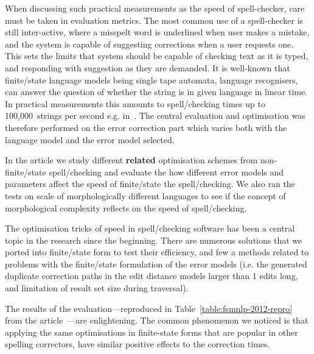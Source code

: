 \documentclass[officiallayout]{unihelcompling}
\begin{document}
When discussing such practical measurements as the speed of spell-checker, care
must be taken in evaluation metrics. The most common use of a spell-checker is
still inter-active, where a misspelt word is underlined when user makes a
mistake, and the system is capable of suggesting corrections when a user
requests one. This sets the limits that system should be capable of checking
text as it is typed, and responding with suggestion as they are demanded. It is
well-known that finite\-/state language models being single tape automata,
language recognisers, can answer the question of whether the string is in given
language in linear time. In practical measurements this amounts to
spell\-/checking times up to 100,000~strings per second e.g.
in~\citet{silfverberg2009hfst}. The central evaluation and optimisation was
therefore performed on the error correction part which varies both with the
language model and the error model selected.

In the article we study different \textbf{related} optimisation schemes from
non-finite\-/state spell\-/checking and evaluate the how different error models and
parameters affect the speed of finite\-/state the spell\-/checking. We also ran the
tests on scale of morphologically different languages to see if the concept of
morphological complexity reflects on the speed of spell\-/checking.

The optimisation tricks of speed in spell\-/checking software has been a central
topic in the research since the beginning. There are numerous solutions that we
ported into finite\-/state form to test their efficiency, and few a methods
related to problems with the finite\-/state formulation of the error models (i.e.
the generated duplicate correction paths in the edit distance models larger
than 1 edits long, and limitation of result set size during traversal).

The results of the evaluation---reproduced in
Table~\ref{table:fsmnlp-2012-repro} from the
article~---are enlightening. The common
phenomenon we noticed is that applying the same optimisations in finite-state
forms that are popular in other spelling correctors, have similar positive
effects to the correction times.
\end{document}
